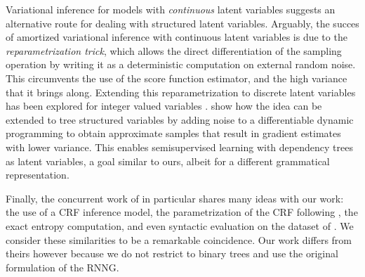   Variational inference for models with \textit{continuous} latent variables suggests an alternative route for dealing with structured latent variables. Arguably, the succes of amortized variational inference with continuous latent variables \citep{kingma2014vae,rezende2014dgm} is due to the \textit{reparametrization trick}, which allows the direct differentiation of the sampling operation by writing it as a deterministic computation on external random noise. This circumvents the use of the score function estimator, and the high variance that it brings along. Extending this reparametrization to discrete latent variables has been explored for integer valued variables \citep{jang2017gumbel,maddison2017concrete}. \citet{corro2018differentiable} show how the idea can be extended to tree structured variables by adding noise to a differentiable dynamic programming to obtain approximate samples that result in gradient estimates with lower variance. This enables semisupervised learning with dependency trees as latent variables, a goal similar to ours, albeit for a different grammatical representation.

  Finally, the concurrent work of \citet{kim2019unsupervised} in particular shares many ideas with our work: the use of a CRF inference model, the parametrization of the CRF following \citet{stern2017minimal}, the exact entropy computation, and even syntactic evaluation on the dataset of \citet{linzen2018targeted}. We consider these similarities to be a remarkable coincidence. Our work differs from theirs however because we do not restrict to binary trees and use the original formulation of the RNNG.
